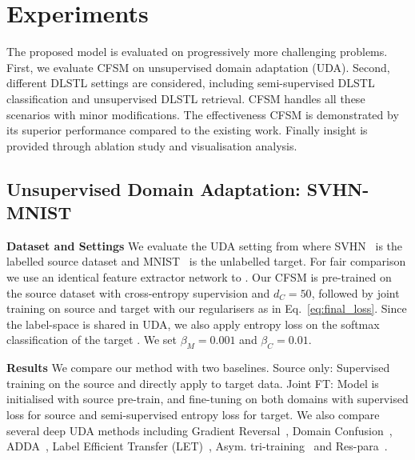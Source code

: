 \documentclass[letterpaper]{article} \usepackage{aaai19}  \usepackage{times}  \usepackage{helvet}  \usepackage{courier}  \usepackage{url}  \usepackage{graphicx}
\newcommand{\keypoint}[1]{\noindent\textbf{#1}\quad}
\begin{document}
\section{Experiments}\label{Sec:Exp}
\begin{comment}
\textcolor{blue}{Different Transfer Learning Experiments should be presented, from easy to hard. 1. Unsupervised transfer learning with disjoint label space (Person Re-ID and Sketch-photo). 2. Unsupervised transfer learning with joint label space (UDA); 3.Semi-supervised transfer learning with disjoint label space (SVHN 0-4 $\Rightarrow$ MNIST 5-9); }

\textcolor{blue}{different experiments with different setting. There should be an '\textbf{Model Details}' paragraph in each setting.}

\textcolor{blue}{Terminology consistency.}
\end{comment}
The proposed model is evaluated on progressively more challenging problems.   
First, we evaluate CFSM on unsupervised domain adaptation (UDA).
Second, different DLSTL settings are considered, including semi-supervised DLSTL classification and unsupervised DLSTL retrieval. CFSM handles all these  scenarios with minor modifications. The effectiveness CFSM is demonstrated by its superior performance compared to the existing work. 
Finally insight is provided through ablation study and visualisation analysis.


\subsection{Unsupervised Domain Adaptation: SVHN-MNIST}

\keypoint{Dataset and Settings} We evaluate the UDA setting from \cite{ganin2016domain} where SVHN~\cite{svhn_data} is the labelled source dataset and MNIST~\cite{mnist_data} is the unlabelled target. For fair comparison we use an identical feature extractor network to  \cite{label_eff_open_da_2017}. Our CFSM is pre-trained on the source dataset with cross-entropy supervision and $d_C=50$, followed by joint training on source and target with our regularisers as in Eq.~\ref{eq:final_loss}. Since the label-space is shared in UDA, we also apply entropy loss on the softmax classification of the target \cite{long2016unsupervised}. We set $\beta_M=0.001$ and $\beta_C=0.01$. 

\keypoint{Results} We compare our method with two baselines. Source only: Supervised training on the source and directly apply to target data. Joint FT: Model is initialised with source pre-train, and fine-tuning on both domains with supervised loss for source and semi-supervised entropy loss for target. We also compare several deep UDA methods including Gradient Reversal~\cite{ganin2016domain}, Domain Confusion~\cite{tzeng2015simultaneousTransfer}, ADDA~\cite{adversarial_feat_cvpr17}, Label Efficient Transfer (LET)~\cite{label_eff_open_da_2017}, Asym. tri-training~\cite{saito2017asymmetric} and Res-para~\cite{rozantsev2018residual}.
\end{document}
